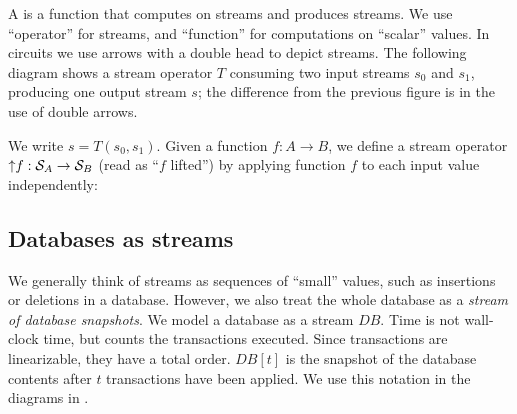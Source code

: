 A  is a function that computes on streams and
produces streams.  We use ``operator'' for streams, and ``function''
for computations on ``scalar'' values.  In circuits we use arrows with
a double head to depict streams.  The following diagram shows a stream
operator $T$ consuming two input streams $s_0$ and $s_1$, producing
one output stream $s$; the difference from the previous figure is in
the use of double arrows.
%
\begin{center}
\end{center}
%
We write $s = T(s_0, s_1)$.
Given a function $f: A \to B$, we define a stream operator ${\uparrow}f
:\mathcal{S}_{A} \to \mathcal{S}_{B}$ (read as ``$f$ lifted'') by applying
function $f$ to each input value independently:

\noindent
\begin{center}
\end{center}

\subsection{Databases as streams}

We generally think of streams as sequences of ``small'' values, such
as insertions or deletions in a database.  However, we also treat the
whole database as a \emph{stream of database snapshots}.  We model a
database as a stream $DB$.  Time is not wall-clock time, but counts
the transactions executed.  Since transactions are linearizable, they
have a total order.  $DB[t]$ is the snapshot of the database contents
after $t$ transactions have been applied.  We use this notation in the
diagrams in .

